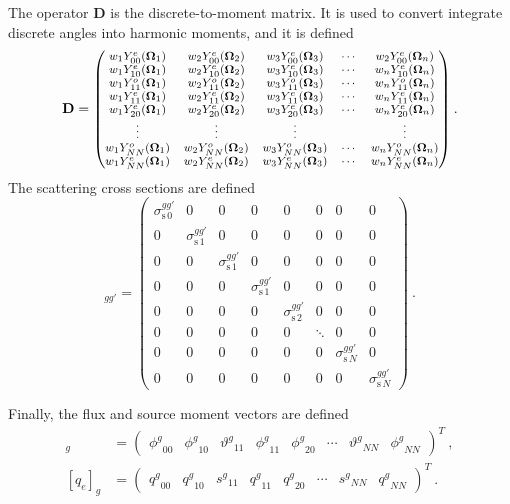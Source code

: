 \documentclass[12pt,twoside]{article}
\newcommand{\ve}[1]{\ensuremath{\mathbf{#1}}}
\newcommand{\vOmega}{\ensuremath{\ve{\Omega}}}
\newcommand{\Ye}[2]{\ensuremath{Y^e_{#1}(\vOmega_#2)}}
\newcommand{\Yo}[2]{\ensuremath{Y^o_{#1}(\vOmega_#2)}}
\newcommand{\sigg}[1]{\ensuremath{\sigma^{gg'}_{\text{s}\,#1}}}
\newcommand{\even}{\ensuremath{\phi^g}}
\newcommand{\odd}{\ensuremath{\vartheta^g}}
\newcommand{\qe}{\ensuremath{q^g}}
\newcommand{\qo}{\ensuremath{s^g}}
\begin{document}
%
The operator $\ve{D}$ is the discrete-to-moment matrix. It is used
to convert integrate discrete angles into harmonic moments, and it is defined
\begin{equation}
  {\footnotesize
  \ve{D} = \begin{pmatrix}
    w_1\Ye{00}{1} & w_2\Ye{00}{2} & w_3\Ye{00}{3} & \cdots & w_2\Ye{00}{n} \\ 
    w_1\Ye{10}{1} & w_2\Ye{10}{2} & w_3\Ye{10}{3} & \cdots & w_n\Ye{10}{n} \\
    w_1\Yo{11}{1} & w_2\Yo{11}{2} & w_3\Yo{11}{3} & \cdots & w_n\Yo{11}{n} \\
    w_1\Ye{11}{1} & w_2\Ye{11}{2} & w_3\Ye{11}{3} & \cdots & w_n\Ye{11}{n} \\
    w_1\Ye{20}{1} & w_2\Ye{20}{2} & w_3\Ye{20}{3} & \cdots & w_n\Ye{20}{n} \\
    \vdots        & \vdots        & \vdots        &        & \vdots        \\
    w_1\Yo{NN}{1} & w_2\Yo{NN}{2} & w_3\Yo{NN}{3} & \cdots & w_n\Yo{NN}{n} \\
    w_1\Ye{NN}{1} & w_2\Ye{NN}{2} & w_3\Ye{NN}{3} & \cdots & w_n\Ye{NN}{n}
  \end{pmatrix}}\:.
\end{equation}
%
The scattering cross sections are defined
\begin{equation}
  [\ve{S}]_{gg'} = \begin{pmatrix}
    \sigg{0} & 0 & 0 & 0 & 0 & 0 & 0 & 0 \\
    0 & \sigg{1} & 0 & 0 & 0 & 0 & 0 & 0 \\
    0 & 0 & \sigg{1} & 0 & 0 & 0 & 0 & 0 \\
    0 & 0 & 0 & \sigg{1} & 0 & 0 & 0 & 0 \\
    0 & 0 & 0 & 0 & \sigg{2} & 0 & 0 & 0 \\
    0 & 0 & 0 & 0 & 0 & \ddots   & 0 & 0 \\
    0 & 0 & 0 & 0 & 0 & 0 & \sigg{N} & 0 \\
    0 & 0 & 0 & 0 & 0 & 0 & 0 & \sigg{N}
  \end{pmatrix}\:.
\end{equation}

Finally, the flux and source moment vectors are defined
\begin{align}
  [\phi]_g &= \begin{pmatrix}
    \even_{00} & \even_{10} & \odd_{11} & \even_{11} & \even_{20}
    & \cdots & \odd_{NN} & \even_{NN}
  \end{pmatrix}^T\:,\\
  [q_e]_g &= \begin{pmatrix}
    \qe_{00} & \qe_{10} & \qo_{11} & \qe_{11} & \qe_{20}
    & \cdots & \qo_{NN} & \qe_{NN}
  \end{pmatrix}^T\:.
\end{align}
\end{document}

